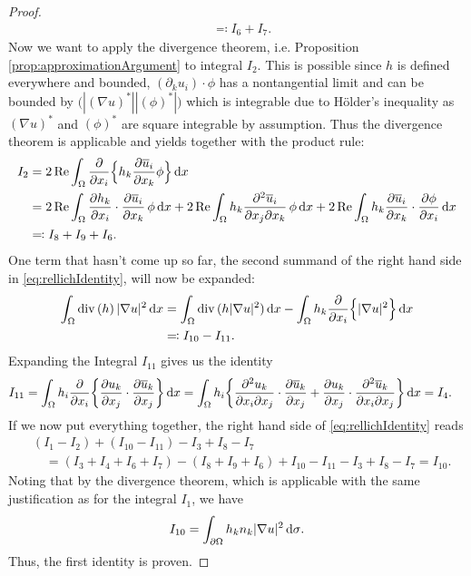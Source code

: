 \begin{proof}
\begin{align*}
     &\eqqcolon I_6 + I_7 .
  \end{align*}
  Now we want to apply the divergence theorem, i.e. Proposition \ref{prop:approximationArgument} to integral $I_2$.
  This is possible since $h$ is defined everywhere and bounded, $(\partial_k u_i) \cdot \phi$ has a nontangential limit and can be bounded by $\big( |(\nabla u)^*| |(\phi)^*| \big)$ which is integrable due to Hölder's inequality as $(\nabla u)^*$ and $(\phi)^*$ are square integrable by assumption.
  Thus the divergence theorem is applicable and yields together with the product rule:
  \begin{align*}
    I_2
    &= 2 \operatorname{Re} \int_\Omega \frac{\partial}{\partial x_i} \Big\{ h_k \frac{\partial \overline u_i}{\partial x_k} \phi \Big\} \, {\operatorname{d}\!{x}} \\
    &= 2 \operatorname{Re} \int_\Omega \frac{\partial h_k}{\partial x_i} \cdot \frac{\partial \overline u_i}{\partial x_k} \, \phi \, {\operatorname{d}\!{x}} + 2 \operatorname{Re} \int_\Omega h_k \frac{\partial^2 \overline u_i}{\partial x_j \partial x_k} \, \phi \, {\operatorname{d}\!{x}} + 2 \operatorname{Re} \int_\Omega h_k \frac{\partial \overline u_i}{\partial x_k} \cdot \frac{\partial \phi}{\partial x_i} \, {\operatorname{d}\!{x}}\\
    &\eqqcolon I_8 + I_9 + I_6.
  \end{align*}
  One term that hasn't come up so far, the second summand of the right hand side in \eqref{eq:rellichIdentity}, will now be expanded:
  \begin{align*}
    \int_\Omega \mathrm{div\,} (h)\,  |\nabla u|^2 \, {\operatorname{d}\!{x}}
    &= \int_\Omega \mathrm{div\,} ( h|\nabla u|^2) \, {\operatorname{d}\!{x}} - \int_\Omega h_k \frac{\partial}{\partial x_i} \Big\{ |\nabla u|^2 \Big\} \, {\operatorname{d}\!{x}} \\
    &\eqqcolon I_{10} - I_{11}.
  \end{align*}
  Expanding the Integral $I_{11}$ gives us the identity
  \begin{align*}
    I_{11}
    &= \int_\Omega h_i \frac{\partial}{\partial x_i} \bigg\{ \frac{\partial u_k}{\partial x_j} \cdot \frac{\partial \overline u_k}{\partial x_j} \bigg\} \, {\operatorname{d}\!{x}}
    = \int_\Omega h_i  \bigg\{ \frac{\partial^2 u_k}{\partial x_i \partial x_j} \cdot \frac{\partial \overline u_k}{\partial x_j} + \frac{\partial u_k}{\partial x_j} \cdot \frac{\partial^2 \overline u_k}{\partial x_i \partial x_j} \bigg\} \, {\operatorname{d}\!{x}}= I_4.
  \end{align*}
  If we now put everything together, the right hand side of \eqref{eq:rellichIdentity} reads
  \begin{align*}
    &(I_1 - I_2) + (I_{10} - I_{11}) - I_3 + I_8 - I_7 \\
    &\quad= (I_3 + I_4 + I_6 + I_7) - (I_8 + I_9 + I_6) + I_{10} - I_{11} - I_3 + I_8 - I_7 = I_{10}.
  \end{align*}
  Noting that by the divergence theorem, which is applicable with the same justification as for the integral $I_1$, we have
  \begin{align*}
    I_{10} = \int_{\partial\Omega} h_k n_k |\nabla u|^2 \, {\operatorname{d}\!{\sigma}}.
  \end{align*}
  Thus, the first identity is proven.


\end{proof}
